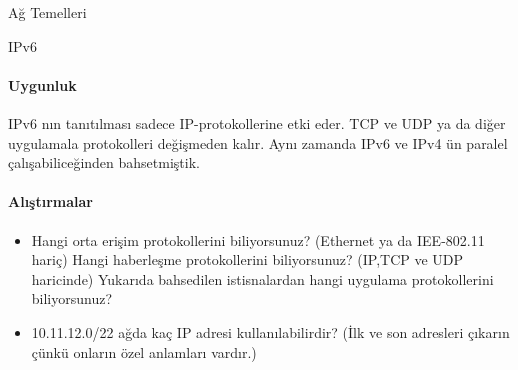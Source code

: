 \begin{section}{Ağ Temelleri}
\begin{subsection}{IPv6}
\paragraph{Uygunluk}{IPv6 nın tanıtılması sadece IP-protokollerine etki eder. TCP ve UDP ya da diğer uygulamala protokolleri değişmeden kalır. Aynı zamanda IPv6 ve IPv4 ün paralel çalışabiliceğinden bahsetmiştik.}

\paragraph{Alıştırmalar}{
\begin{itemize}
 \item Hangi orta erişim protokollerini biliyorsunuz? (Ethernet ya da IEE-802.11 hariç) Hangi haberleşme protokollerini biliyorsunuz? (IP,TCP ve UDP haricinde) Yukarıda bahsedilen istisnalardan hangi uygulama protokollerini biliyorsunuz?
 \item 10.11.12.0/22 ağda kaç IP adresi kullanılabilirdir? (İlk ve son adresleri çıkarın çünkü onların özel anlamları vardır.)
\end{itemize}}
\end{subsection}
\end{section}

